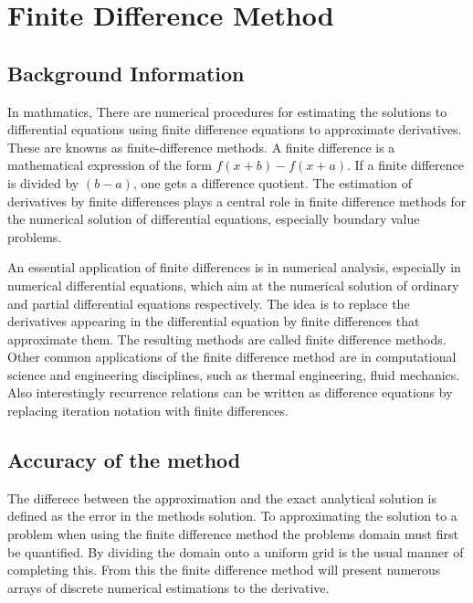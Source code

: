 \documentclass[a4paper,11pt]{article}
\begin{document}
\section{Finite Difference Method}

\subsection{Background Information}

\par\hspace{4mm} In mathmatics, There are numerical procedures for estimating the solutions to differential equations using finite difference equations to approximate derivatives. These are knowns as finite-difference methods. A finite difference is a mathematical expression of the form \(f(x + b) - f(x + a)\). If a finite difference is divided by \((b - a)\), one gets a difference quotient. The estimation of derivatives by finite differences plays a central role in finite difference methods for the numerical solution of differential equations, especially boundary value problems.
\vspace{5mm} \par \indent An essential application of finite differences is in numerical analysis, especially in numerical differential equations, which aim at the numerical solution of ordinary and partial differential equations respectively. The idea is to replace the derivatives appearing in the differential equation by finite differences that approximate them. The resulting methods are called finite difference methods. Other common applications of the finite difference method are in computational science and engineering disciplines, such as thermal engineering, fluid mechanics. Also interestingly recurrence relations can be written as difference equations by replacing iteration notation with finite differences.

\subsection{Accuracy of the method}

\par\hspace{4mm} The differece between the approximation and the exact analytical solution is defined as the error in the methods solution. To approximating the solution to a problem when using the finite difference method the problems domain must first be quantified. By dividing the domain onto a uniform grid is the usual manner of completing this. From this the finite difference method will present numerous arrays of discrete numerical estimations to the derivative.
\end{document}
